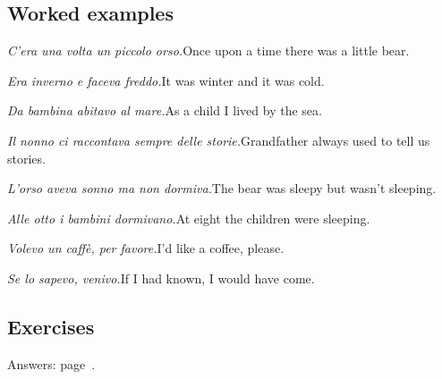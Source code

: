 \documentclass[11pt,a4paper,twoside,openright]{book}
\begin{document}
\subsection*{Worked examples}
\begin{examples}
\item\relax \textit{C'era una volta un piccolo orso.}\newline Once upon a time there was a little bear.
\item\relax \textit{Era inverno e faceva freddo.}\newline It was winter and it was cold.
\item\relax \textit{Da bambina abitavo al mare.}\newline As a child I lived by the sea.
\item\relax \textit{Il nonno ci raccontava sempre delle storie.}\newline Grandfather always used to tell us stories.
\item\relax \textit{L'orso aveva sonno ma non dormiva.}\newline The bear was sleepy but wasn't sleeping.
\item\relax \textit{Alle otto i bambini dormivano.}\newline At eight the children were sleeping.
\item\relax \textit{Volevo un caffè, per favore.}\newline I’d like a coffee, please.
\item\relax \textit{Se lo sapevo, venivo.}\newline If I had known, I would have come.
\end{examples}

\subsection*{Exercises}\label{les:imperfetto:exercises}
{\color{muted}\small Answers: page~\pageref{ans:imperfetto}.}
\end{document}
